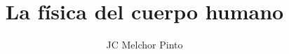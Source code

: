 \documentclass[12pt,addpoints]{guia}
\title{La física del cuerpo humano}
\author{JC Melchor Pinto}
\begin{document}
\INFO%

\vspace{0.5em}
\begin{questions}
    \questionboxed[15]{}%
    \questionboxed[15]{}
    \questionboxed[15]{}
    \questionboxed[15]{}
    
    \questionboxed[25]{}
    \questionboxed[15]{}
\end{questions}
\end{document}
